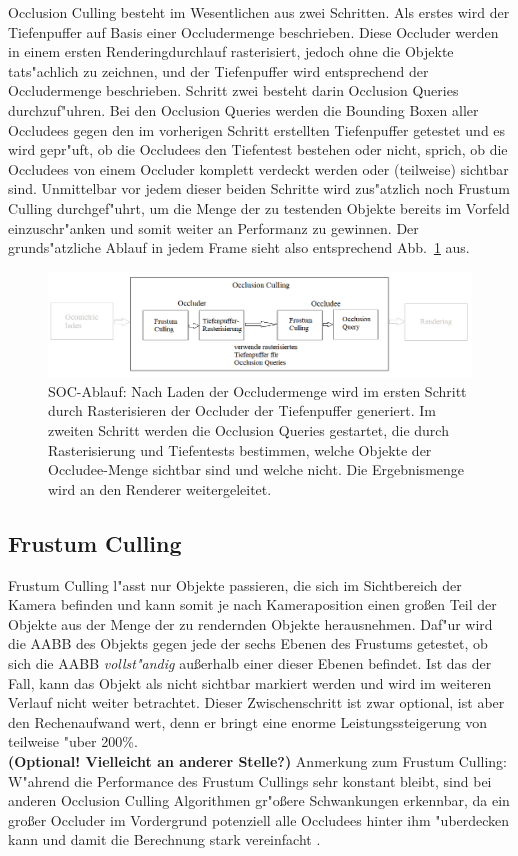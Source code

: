 \documentclass[journal]{vgtc}
\begin{document}
Occlusion Culling besteht im Wesentlichen aus zwei Schritten. Als erstes wird der Tiefenpuffer auf Basis einer Occludermenge beschrieben. Diese Occluder werden in einem ersten Renderingdurchlauf rasterisiert, jedoch ohne die Objekte tats"achlich zu zeichnen, und der Tiefenpuffer wird entsprechend der Occludermenge beschrieben. Schritt zwei besteht darin Occlusion Queries durchzuf"uhren. Bei den Occlusion Queries werden die Bounding Boxen aller Occludees gegen den im vorherigen Schritt erstellten Tiefenpuffer getestet und es wird gepr"uft, ob die Occludees den Tiefentest bestehen oder nicht, sprich, ob die Occludees von einem Occluder komplett verdeckt werden oder (teilweise) sichtbar sind. Unmittelbar vor jedem dieser beiden Schritte wird zus"atzlich noch Frustum Culling durchgef"uhrt, um die Menge der zu testenden Objekte bereits im Vorfeld einzuschr"anken und somit weiter an Performanz zu gewinnen. Der grunds"atzliche Ablauf in jedem Frame sieht also entsprechend Abb.\ \ref{fig:socablauf} aus.
\begin{figure}%
\includegraphics[width=\columnwidth]{images/SOCAblauf3.png}%
\caption{SOC-Ablauf: Nach Laden der Occludermenge wird im ersten Schritt durch Rasterisieren der Occluder der Tiefenpuffer generiert. Im zweiten Schritt werden die Occlusion Queries gestartet, die durch Rasterisierung und Tiefentests bestimmen, welche Objekte der Occludee-Menge sichtbar sind und welche nicht. Die Ergebnismenge wird an den Renderer weitergeleitet.}%
\label{fig:socablauf}%
\end{figure}


\subsection{Frustum Culling}
Frustum Culling l"asst nur Objekte passieren, die sich im Sichtbereich der Kamera befinden und kann somit je nach Kameraposition einen gro{\ss}en Teil der Objekte aus der Menge der zu rendernden Objekte herausnehmen. Daf"ur wird die AABB des Objekts gegen jede der sechs Ebenen des Frustums getestet, ob sich die AABB \textit{vollst"andig} au{\ss}erhalb einer dieser Ebenen befindet. Ist das der Fall, kann das Objekt als nicht sichtbar markiert werden und wird im weiteren Verlauf nicht weiter betrachtet. Dieser Zwischenschritt ist zwar optional, ist aber den Rechenaufwand wert, denn er bringt eine enorme Leistungssteigerung von teilweise "uber 200\%.\\
\textbf{(Optional! Vielleicht an anderer Stelle?)} Anmerkung zum Frustum Culling: W"ahrend die Performance des Frustum Cullings sehr konstant bleibt, sind bei anderen Occlusion Culling Algorithmen gr"o\ss{}ere Schwankungen erkennbar, da ein gro\ss{}er Occluder im Vordergrund potenziell alle Occludees hinter ihm "uberdecken kann und damit die Berechnung stark vereinfacht \cite{MSOC}.\\
\end{document}
